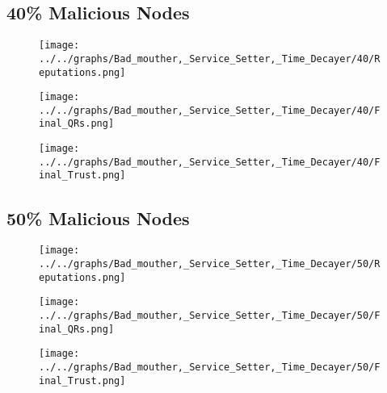 \begin{minipage}[t]{0.49\columnwidth}
\subsection*{40\% Malicious Nodes}
    \begin{figure}[H]
        \centering
        \texttt{[image: ../../graphs/Bad\_mouther,\_Service\_Setter,\_Time\_Decayer/40/Reputations.png]}
    \end{figure}
    \begin{figure}[H]
        \centering
        \texttt{[image: ../../graphs/Bad\_mouther,\_Service\_Setter,\_Time\_Decayer/40/Final\_QRs.png]}
    \end{figure}
\end{minipage}
\begin{minipage}[t]{0.49\columnwidth}
    \begin{figure}[H]
        \centering
        \texttt{[image: ../../graphs/Bad\_mouther,\_Service\_Setter,\_Time\_Decayer/40/Final\_Trust.png]}
    \end{figure}
\end{minipage}

\begin{minipage}[t]{0.49\columnwidth}
\subsection*{50\% Malicious Nodes}
    \begin{figure}[H]
        \centering
        \texttt{[image: ../../graphs/Bad\_mouther,\_Service\_Setter,\_Time\_Decayer/50/Reputations.png]}
    \end{figure}
    \begin{figure}[H]
        \centering
        \texttt{[image: ../../graphs/Bad\_mouther,\_Service\_Setter,\_Time\_Decayer/50/Final\_QRs.png]}
    \end{figure}
\end{minipage}
\begin{minipage}[t]{0.49\columnwidth}
    \begin{figure}[H]
        \centering
        \texttt{[image: ../../graphs/Bad\_mouther,\_Service\_Setter,\_Time\_Decayer/50/Final\_Trust.png]}
    \end{figure}
\end{minipage}

